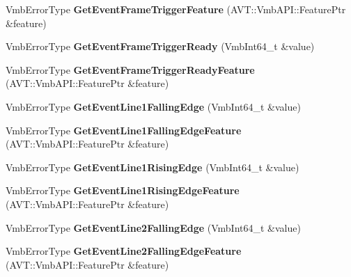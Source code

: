 \begin{DoxyCompactItemize}
\item 
\hypertarget{classMakoCamera_a41c408689c870ed6682704744b4eae81}{Vmb\-Error\-Type {\bfseries Get\-Event\-Frame\-Trigger\-Feature} (A\-V\-T\-::\-Vmb\-A\-P\-I\-::\-Feature\-Ptr \&feature)}\label{classMakoCamera_a41c408689c870ed6682704744b4eae81}

\item 
\hypertarget{classMakoCamera_a7f699ae8fbe15a55e02af319b1f40848}{Vmb\-Error\-Type {\bfseries Get\-Event\-Frame\-Trigger\-Ready} (Vmb\-Int64\-\_\-t \&value)}\label{classMakoCamera_a7f699ae8fbe15a55e02af319b1f40848}

\item 
\hypertarget{classMakoCamera_a4775cab2e33950449cbc1c27a578402a}{Vmb\-Error\-Type {\bfseries Get\-Event\-Frame\-Trigger\-Ready\-Feature} (A\-V\-T\-::\-Vmb\-A\-P\-I\-::\-Feature\-Ptr \&feature)}\label{classMakoCamera_a4775cab2e33950449cbc1c27a578402a}

\item 
\hypertarget{classMakoCamera_a47816bef6ae252ead1fcb318dd8fe9f4}{Vmb\-Error\-Type {\bfseries Get\-Event\-Line1\-Falling\-Edge} (Vmb\-Int64\-\_\-t \&value)}\label{classMakoCamera_a47816bef6ae252ead1fcb318dd8fe9f4}

\item 
\hypertarget{classMakoCamera_a34a8c5e723d36f6b2cc06c14b70eb7bb}{Vmb\-Error\-Type {\bfseries Get\-Event\-Line1\-Falling\-Edge\-Feature} (A\-V\-T\-::\-Vmb\-A\-P\-I\-::\-Feature\-Ptr \&feature)}\label{classMakoCamera_a34a8c5e723d36f6b2cc06c14b70eb7bb}

\item 
\hypertarget{classMakoCamera_abe9be9732bf11cf88cbd6604ecbd7aed}{Vmb\-Error\-Type {\bfseries Get\-Event\-Line1\-Rising\-Edge} (Vmb\-Int64\-\_\-t \&value)}\label{classMakoCamera_abe9be9732bf11cf88cbd6604ecbd7aed}

\item 
\hypertarget{classMakoCamera_a49ede935814d0bec31e4b4c973bf5248}{Vmb\-Error\-Type {\bfseries Get\-Event\-Line1\-Rising\-Edge\-Feature} (A\-V\-T\-::\-Vmb\-A\-P\-I\-::\-Feature\-Ptr \&feature)}\label{classMakoCamera_a49ede935814d0bec31e4b4c973bf5248}

\item 
\hypertarget{classMakoCamera_a090d831c4635e962335b309f24735940}{Vmb\-Error\-Type {\bfseries Get\-Event\-Line2\-Falling\-Edge} (Vmb\-Int64\-\_\-t \&value)}\label{classMakoCamera_a090d831c4635e962335b309f24735940}

\item 
\hypertarget{classMakoCamera_a7db65f53ac12c209664a6ddfc641befd}{Vmb\-Error\-Type {\bfseries Get\-Event\-Line2\-Falling\-Edge\-Feature} (A\-V\-T\-::\-Vmb\-A\-P\-I\-::\-Feature\-Ptr \&feature)}\label{classMakoCamera_a7db65f53ac12c209664a6ddfc641befd}


\end{DoxyCompactItemize}
